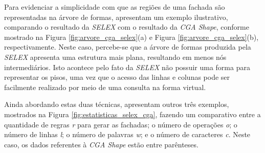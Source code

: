 Para evidenciar a simplicidade com que as regiões de uma fachada são representadas na árvore de formas,  apresentam um exemplo ilustrativo, comparando o resultado da \textit{SELEX} com o resultado da \textit{CGA Shape}, conforme mostrado na Figura \ref{fig:arvore_cga_selex}(a) e Figura \ref{fig:arvore_cga_selex}(b), respectivamente. Neste caso, percebe-se que a árvore de formas produzida pela \textit{SELEX} apresenta uma estrutura mais plana, resultando em menos nós intermediários. Isto acontece pelo fato da \textit{SELEX} não possuir uma forma para representar os pisos, uma vez que o acesso das linhas e colunas pode ser facilmente realizado por meio de uma consulta na forma virtual.

\begin{figure}[h!]
	\centering
	\captionsetup{width=15cm}
	{}	
\end{figure}

\newpage

Ainda abordando estas duas técnicas,  apresentam outros três exemplos, mostrados na Figura \ref{fig:estatisticas_selex_cga}, fazendo um comparativo entre a quantidade de regras \textit{r} para gerar as fachadas; o número de operações \textit{o}; o número de linhas \textit{l}; o número de palavras \textit{w}; e o número de caracteres \textit{c}. Neste caso, os dados referentes à \textit{CGA Shape} estão entre parênteses.

\begin{figure}[h!]
	\centering
	\captionsetup{width=15cm}
	{}	
\end{figure}

